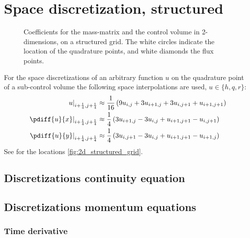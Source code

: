 \section{Space discretization, structured}
\begin{figure}[H]
    \begin{center}
        \def\svgwidth{0.80\textwidth} %
        \resizebox{0.65\textwidth}{!}{
            
        }
    \end{center}
    \caption[Definition of the grid to solve the 2D-shallow water equations (interior area)]{Coefficients for the mass-matrix and the control volume in 2-dimensions, on a structured grid. The white circles indicate the location of the quadrature points, and white diamonds the flux points.}
    \label{fig:2d_structured_grid}
\end{figure}
For the space discretizations of an arbitrary function $u$ on the quadrature point of a sub-control volume the following space interpolations are used, $u \in \{h,q,r\}$:
\begin{align}
    \left. u\right|_{i+\quart, j+\quart} & \approx \frac{1}{16}\left( 9u_{i, j} + 3 u_{i+1,j}  + 3  u_{i, j+1} + u_{i+1, j+1}\right)
    \\
    \left. \pdiff{u}{x}\right|_{i+\quart, j+\quart} & \approx \quart \left( 3 u_{i+1,j} - 3 u_{i,j} + u_{i+1, j+1} - u_{i, j+1} \right)
    \\
    \left. \pdiff{u}{y}\right|_{i+\quart, j+\quart} & \approx \quart \left( 3 u_{i, j+1} - 3 u_{i, j} + u_{i+1, j+1} - u_{i+1, j}\right)
\end{align}
See for the locations \autoref{fig:2d_structured_grid}.
\subsection{Discretizations continuity equation}
\subsection{Discretizations momentum equations}
\subsubsection{Time derivative}
\notyet
